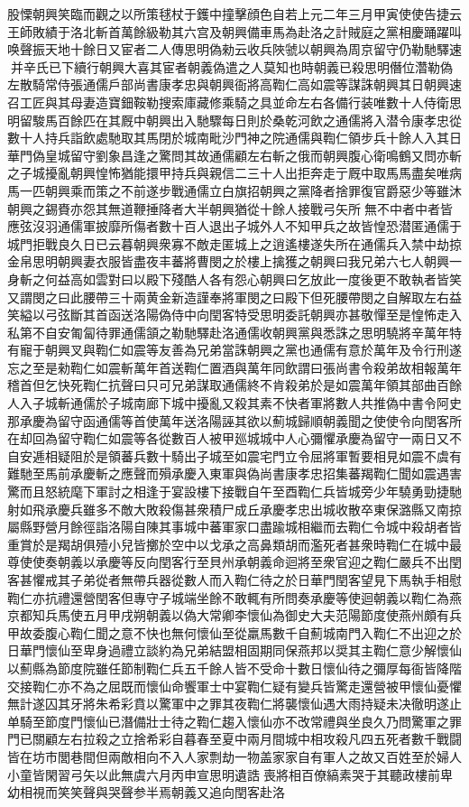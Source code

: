股慄朝興笑臨而觀之以所策毬杖于鑊中撞擊顔色自若上元二年三月甲寅使使告捷云王師敗績于洛北斬首萬餘級勒其六宫及朝興備車馬為赴洛之計賊庭之黨相慶踊躍叫唤聲振天地十餘日又宦者二人傳思明偽勑云收兵陜虢以朝興為周京留守仍勒馳驛速并辛氏已下續行朝興大喜其宦者朝義偽遣之人莫知也時朝義已殺思明僭位濳勒偽左散騎常侍張通儒戶部尚書康孝忠與朝興衙將高鞫仁高如震等謀誅朝興其日朝興速召工匠與其母妻造寶鈿鞍勒搜索庫藏修乘騎之具並命左右各備行装唯數十人侍衛思明留駿馬百餘匹在其厩中朝興出入馳驟每日則於桑乾河飲之通儒將入潜令康孝忠從數十人持兵詣飲處馳取其馬閉於城南毗沙門神之院通儒與鞫仁領步兵十餘人入其日華門偽皇城留守劉象昌逢之驚問其故通儒顧左右斬之俄而朝興腹心衛鳴鶴又問亦斬之子城擾亂朝興惶怖猶能擐甲持兵與親信二三十人出拒奔走亍厩中取馬馬盡矣唯病馬一匹朝興乘而策之不前遂步戰通儒立白旗招朝興之黨降者捨罪復官爵惡少等雖沐朝興之錫賚亦怨其無道鞭捶降者大半朝興猶從十餘人接戰弓矢所無不中者中者皆應弦沒羽通儒軍披靡所傷者數十百人退出子城外人不知甲兵之故皆惶恐潜匿通儒于城門拒戰良久日已云暮朝興衆寡不敵走匿城上之逍遙樓遂失所在通儒兵入禁中劫掠金帛思明朝興妻衣服皆盡夜丰蕃將曹閔之於樓上擒獲之朝興曰我兄弟六七人朝興一身斬之何益高如雲對曰以殿下殘酷人各有怨心朝興曰乞放此一度後更不敢執者皆笑又謂閔之曰此腰帶三十兩黄金新造謹奉將軍閔之曰殿下但死腰帶閔之自解取左右益笑縊以弓弦斷其首函送洛陽偽侍中向閏客特受思明委託朝興亦甚敬憚至是惶怖走入私第不自安匍匐待罪通儒頷之勒馳驛赴洛通儒收朝興黨與悉誅之思明驍將辛萬年特有寵于朝興叉與鞫仁如震等友善為兄弟當誅朝興之黨也通儒有意於萬年及令行刑遂忘之至是勑鞫仁如震斬萬年首送鞫仁置酒與萬年同飲謂曰張尚書令殺弟故相報萬年稽首但乞快死鞫仁抗聲曰只可兄弟謀取通儒終不肯殺弟於是如震萬年領其部曲百餘人入子城斬通儒於子城南廊下城中擾亂又殺其素不快者軍將數人共推偽中書令阿史那承慶為留守函通儒等首使萬年送洛陽誣其欲以薊城歸順朝義聞之使使令向閏客所在却回為留守鞫仁如震等各從數百人被甲廵城城中人心彌懼承慶為留守一兩日又不自安逓相疑阻於是領蕃兵數十騎出子城至如震宅門立令屈將軍暫要相見如震不虞有難馳至馬前承慶斬之應聲而殞承慶入東軍與偽尚書康孝忠招集蕃羯鞫仁聞如震遇害驚而且怒統麾下軍討之相逢于宴設樓下接戰自午至酉鞫仁兵皆城旁少年驍勇勁捷馳射如飛承慶兵雖多不敵大敗殺傷甚衆積尸成丘承慶孝忠出城收散卒東保潞縣又南掠屬縣野營月餘徑詣洛陽自陳其事城中蕃軍家口盡踰城相繼而去鞫仁令城中殺胡者皆重賞於是羯胡俱殪小兒皆擲於空中以戈承之高鼻類胡而濫死者甚衆時鞫仁在城中最尊使使奏朝義以承慶等反向閏客行至貝州承朝義命迴將至衆官迎之鞫仁嚴兵不出閏客甚懼戒其子弟從者無帶兵器從數人而入鞫仁待之於日華門閏客望見下馬執手相慰鞫仁亦抗禮還營閏客但專守子城端坐餘不敢輒有所問奏承慶等使迴朝義以鞫仁為燕京都知兵馬使五月甲戌朔朝義以偽大常卿李懷仙為御史大夫范陽節度使燕州頗有兵甲故委腹心鞫仁聞之意不快也無何懷仙至從羸馬數千自薊城南門入鞫仁不出迎之於日華門懷仙至卑身過禮立談約為兄弟結盟相固期同保燕邦以奨其主鞫仁意少解懷仙以薊縣為節度院雖任節制鞫仁兵五千餘人皆不受命十數日懷仙待之彌厚每衙皆降階交接鞫仁亦不為之屈既而懷仙命饗軍士中宴鞫仁疑有變兵皆驚走還營被甲懷仙憂懼無計遂囚其牙將朱希彩賁以驚軍中之罪其夜鞫仁將襲懷仙遇大雨持疑未决徹明遂止单騎至節度門懷仙已潛備壯士待之鞫仁趨入懷仙亦不改常禮與坐良久乃問驚軍之罪門已關顧左右拉殺之立捨希彩自暮春至夏中兩月間城中相攻殺凡四五死者數千戰闘皆在坊市閭巷間但兩敵相向不入人家剽劫一物盖家家自有軍人之故又百姓至於婦人小童皆閑習弓矢以此無虞六月丙申宣思明遺誥喪將相百僚縞素哭于其聽政樓前卑幼相視而笑笑聲與哭聲参半焉朝義又追向閏客赴洛